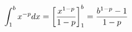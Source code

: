\documentclass[preview]{standalone}
\begin{document}
\begin{align*}
\special{dvisvgm:raw <g id='unique000'>}\displaystyle\int_1^b x^{-p}dx=\left[\dfrac{x^{1-p}}{1-p}\right]_1^b=\dfrac{b^{1-p}-1}{1-p}\special{dvisvgm:raw </g>}
\end{align*}
\end{document}
